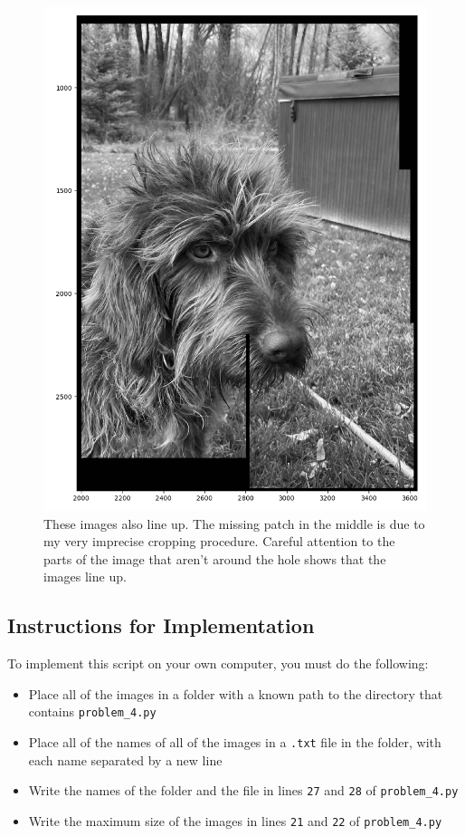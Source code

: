 \documentclass[]{article}
\begin{document}
\begin{figure}[H]
	\centering
	\includegraphics[width=6.5in]{lola_complete_small_hole.png}
	\caption{These images also line up. The missing patch in the middle is due to my very imprecise cropping procedure. Careful attention to the parts of the image that aren't around the hole shows that the images line up.}
\end{figure}

\subsection{Instructions for Implementation}
To implement this script on your own computer, you must do the following:
\begin{itemize}
	\item Place all of the images in a folder with a known path to the directory that contains \texttt{problem\_4.py}
	\item Place all of the names of all of the images in a \texttt{.txt} file in the folder, with each name separated by a new line
	\item Write the names of the folder and the file in lines \texttt{27} and \texttt{28} of \texttt{problem\_4.py}
	\item Write the maximum size of the images in lines \texttt{21} and \texttt{22} of \texttt{problem\_4.py}
	
\end{itemize}
\end{document}
